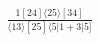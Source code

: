 \documentclass[varwidth, border=5pt]{standalone}
\begin{document}
\begin{my}
$\begin{gathered}
\scriptscriptstyle\frac{1[24]⟨25⟩[34]}{⟨13⟩[25]⟨5|1+3|5]}
\end{gathered}$
\end{my}
\end{document}
